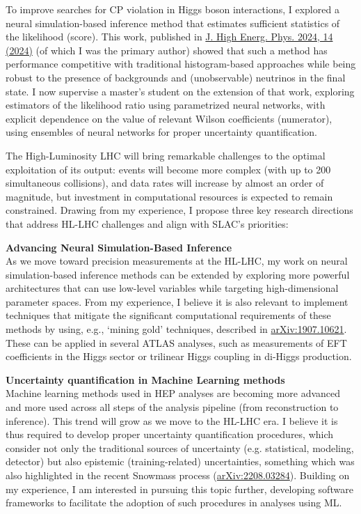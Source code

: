 \documentclass[11pt, a4paper]{awesome-cv}
\begin{document}
\begin{cvletter}
  To improve searches for CP violation in Higgs boson interactions, I explored a neural simulation-based inference method that estimates sufficient statistics of the likelihood (score). This work, published in \href{https://doi.org/10.1007/JHEP04(2024)014}{J. High Energ. Phys. 2024, 14 (2024)} (of which I was the primary author) showed that such a method has performance competitive with traditional histogram-based approaches while being robust to the presence of backgrounds and (unobservable) neutrinos in the final state. I now supervise a master's student on the extension of that work, exploring estimators of the likelihood ratio using parametrized neural networks, with explicit dependence on the value of relevant Wilson coefficients (numerator), using ensembles of neural networks for proper uncertainty quantification.
  
  
  The High-Luminosity LHC will bring remarkable challenges to the optimal exploitation of its output: events will become more complex (with up to 200 simultaneous collisions), and data rates will increase by almost an order of magnitude, but investment in computational resources is expected to remain constrained. Drawing from my experience, I propose three key research directions that address HL-LHC challenges and align with SLAC's priorities:
  
  \textbf{Advancing Neural Simulation-Based Inference}\\
  As we move toward precision measurements at the HL-LHC, my work on neural simulation-based inference methods can be extended by exploring more powerful architectures that can use low-level variables while targeting high-dimensional parameter spaces. From my experience, I believe it is also relevant to implement techniques that mitigate the significant computational requirements of these methods by using, e.g., `mining gold' techniques, described in \href{https://arxiv.org/abs/1907.10621}{arXiv:1907.10621}. These can be applied in several ATLAS analyses, such as measurements of EFT coefficients in the Higgs sector or trilinear Higgs coupling in di-Higgs production.
  
  \textbf{Uncertainty quantification in Machine Learning methods}\\
  Machine learning methods used in HEP analyses are becoming more advanced and more used across all steps of the analysis pipeline (from reconstruction to inference). This trend will grow as we move to the HL-LHC era. I believe it is thus required to develop proper uncertainty quantification procedures, which consider not only the traditional sources of uncertainty (e.g. statistical, modeling, detector) but also epistemic (training-related) uncertainties, something which was also highlighted in the recent Snowmass process (\href{https://arxiv.org/abs/2208.03284}{arXiv:2208.03284}). Building on my experience, I am interested in pursuing this topic further, developing software frameworks to facilitate the adoption of such procedures in analyses using ML.
  

\end{cvletter}
\end{document}
